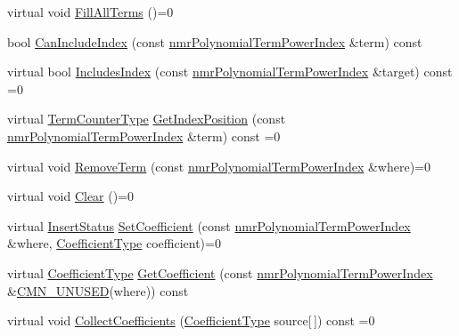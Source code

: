 \begin{DoxyCompactItemize}
\item 
virtual void \hyperlink{classnmr_polynomial_base_a9f0bc5fa29d3e7ff670162f23e9f28d3}{Fill\-All\-Terms} ()=0
\item 
bool \hyperlink{classnmr_polynomial_base_a9547fed45ba78883ab65594bcd46505c}{Can\-Include\-Index} (const \hyperlink{classnmr_polynomial_term_power_index}{nmr\-Polynomial\-Term\-Power\-Index} \&term) const 
\item 
virtual bool \hyperlink{classnmr_polynomial_base_a4530609f1461afe98e49d8899bfe216a}{Includes\-Index} (const \hyperlink{classnmr_polynomial_term_power_index}{nmr\-Polynomial\-Term\-Power\-Index} \&target) const =0
\item 
virtual \hyperlink{classnmr_polynomial_base_a4b0abd66b12b6f5bfb30d0eb1607e661}{Term\-Counter\-Type} \hyperlink{classnmr_polynomial_base_abc7652cef60def42b5f327536bb483e9}{Get\-Index\-Position} (const \hyperlink{classnmr_polynomial_term_power_index}{nmr\-Polynomial\-Term\-Power\-Index} \&term) const =0
\item 
virtual void \hyperlink{classnmr_polynomial_base_ad329db0b6a9372a6f2eb093f8c2272ac}{Remove\-Term} (const \hyperlink{classnmr_polynomial_term_power_index}{nmr\-Polynomial\-Term\-Power\-Index} \&where)=0
\item 
virtual void \hyperlink{classnmr_polynomial_base_a432db50d77044c8e092e273e07abd898}{Clear} ()=0
\item 
virtual \hyperlink{classnmr_polynomial_base_ac3b6b28653104ea70419279a35580940}{Insert\-Status} \hyperlink{classnmr_polynomial_base_ac48244b385d53d08c25fed757ca7ba6a}{Set\-Coefficient} (const \hyperlink{classnmr_polynomial_term_power_index}{nmr\-Polynomial\-Term\-Power\-Index} \&where, \hyperlink{classnmr_polynomial_base_a8693efdfc8585ccb49abea69f74f3eef}{Coefficient\-Type} coefficient)=0
\item 
virtual \hyperlink{classnmr_polynomial_base_a8693efdfc8585ccb49abea69f74f3eef}{Coefficient\-Type} \hyperlink{classnmr_polynomial_base_a44843c32a65c62b2124851b1ca83ceae}{Get\-Coefficient} (const \hyperlink{classnmr_polynomial_term_power_index}{nmr\-Polynomial\-Term\-Power\-Index} \&\hyperlink{cmn_portability_8h_a021894e2626935fa2305434b1e893ff6}{C\-M\-N\-\_\-\-U\-N\-U\-S\-E\-D}(where)) const 
\item 
virtual void \hyperlink{classnmr_polynomial_base_a0e387415f60457ed1e410a1aac35a159}{Collect\-Coefficients} (\hyperlink{classnmr_polynomial_base_a8693efdfc8585ccb49abea69f74f3eef}{Coefficient\-Type} source\mbox{[}$\,$\mbox{]}) const =0
\item 

\end{DoxyCompactItemize}

